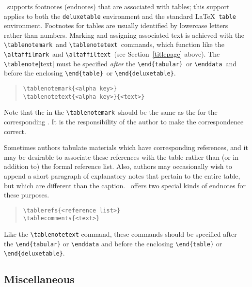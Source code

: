 \documentclass[preprint2]{aastex}
\begin{document}
\aastex\ supports footnotes (endnotes) that are associated with tables; 
this support applies to both the 
\texttt{deluxetable}  environment 
and the standard \LaTeX\ \texttt{table} environment. 
Footnotes for tables are usually identified by lowercase letters 
rather than num\-bers. 
Marking and assigning associated text is achieved with 
the \verb"\tablenotemark"\ 
 and \verb"\tablenotetext"\ 
 commands, which function like the  \verb"\altaffilmark"\ 
 and \verb"\altaffiltext"\ 
 (see Section~\ref{titlepage} above). 
The \verb"\tablenote"\-|text| 
 must be specified 
\emph{after} the \verb"\end{tabular}"\  or \verb"\enddata"\  and before 
the enclosing \verb"\end{table}"\  or \verb"\end{deluxetable}". 
\begin{quote} 
\begin{verbatim} 
\tablenotemark{<alpha key>} 
\tablenotetext{<alpha key>}{<text>} 
\end{verbatim} 
\end{quote} 
Note that the \m{alpha key} in the \verb"\tablenotemark"\ 
should be the same as the 
\m{alpha key} for the corresponding . 
It is the responsibility of the author to make the correspondence 
correct. 
 
Sometimes authors tabulate materials which have corresponding 
references, 
and it may be desirable to associate these references with the table 
rather than (or in addition to) the formal reference list. 
Also, authors may occasionally wish to append a 
short paragraph of explanatory 
notes that pertain to the entire table, but which are different than 
the caption. \aastex\ offers two special kinds of endnotes for these 
purposes. 
\begin{quote} 
\begin{verbatim} 
\tablerefs{<reference list>} 
\tablecomments{<text>} 
\end{verbatim} 
\end{quote} 
 
Like the \verb"\tablenotetext" command, these commands should be 
 specified after the \verb"\end{tabular}" or \verb"\enddata" and before 
the enclosing \verb"\end{table}" or \verb"\end{deluxetable}". 
 
\subsection{Miscellaneous} 
 
\end{document}
